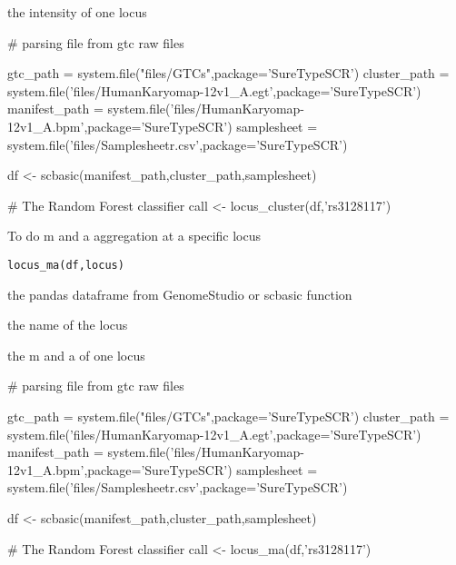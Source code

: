 \documentclass[a4paper]{book}
\begin{document}
%
\begin{Value}
the intensity of one locus
\end{Value}
%
\begin{Examples}
\begin{ExampleCode}

# parsing file from gtc raw files

gtc_path = system.file("files/GTCs",package='SureTypeSCR')
cluster_path = system.file('files/HumanKaryomap-12v1_A.egt',package='SureTypeSCR')
manifest_path = system.file('files/HumanKaryomap-12v1_A.bpm',package='SureTypeSCR')
samplesheet = system.file('files/Samplesheetr.csv',package='SureTypeSCR')

df <- scbasic(manifest_path,cluster_path,samplesheet)

# The Random Forest classifier
call <- locus_cluster(df,'rs3128117') 




\end{ExampleCode}
\end{Examples}
%
\begin{Description}\relax
To do m and a aggregation at a specific locus
\end{Description}
%
\begin{Usage}
\begin{verbatim}
locus_ma(df,locus)
\end{verbatim}
\end{Usage}
%
\begin{Arguments}
\begin{ldescription}
\item[\code{df}] the pandas dataframe from GenomeStudio or scbasic function
\item[\code{locus}] the name of the locus
\end{ldescription}
\end{Arguments}
%
\begin{Value}
the m and a of one locus
\end{Value}
%
\begin{Examples}
\begin{ExampleCode}

# parsing file from gtc raw files

gtc_path = system.file("files/GTCs",package='SureTypeSCR')
cluster_path = system.file('files/HumanKaryomap-12v1_A.egt',package='SureTypeSCR')
manifest_path = system.file('files/HumanKaryomap-12v1_A.bpm',package='SureTypeSCR')
samplesheet = system.file('files/Samplesheetr.csv',package='SureTypeSCR')

df <- scbasic(manifest_path,cluster_path,samplesheet)

# The Random Forest classifier
call <- locus_ma(df,'rs3128117') 




\end{ExampleCode}
\end{Examples}
\end{document}
